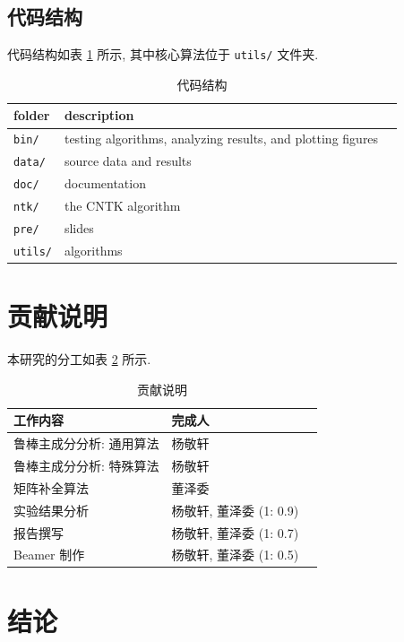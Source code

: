 \documentclass[12pt]{article}
\begin{document}
\subsection{代码结构}

代码结构如表 \ref{tab:code_framework} 所示, 其中核心算法位于 \verb|utils/| 文件夹.

\begin{table}[htbp]
  \centering
  \small
  \caption{代码结构}
  \label{tab:code_framework}
  \begin{tabular}{lll}
    \toprule
    folder & description    \\
    \midrule
    \verb|bin/|    &  testing algorithms, analyzing results, and plotting figures   \\
    \verb|data/|    &  source data and results   \\
    \verb|doc/|    &  documentation   \\
    \verb|ntk/|    &  the CNTK algorithm   \\
    \verb|pre/|    &  slides   \\
    \verb|utils/|    &  algorithms   \\
    \bottomrule
  \end{tabular}
\end{table}

\section{贡献说明}

本研究的分工如表 \ref{tab:contribution} 所示.

\begin{table}[htbp]
  \centering
  \small
  \caption{贡献说明}
  \label{tab:contribution}
  \begin{tabular}{lll}
    \toprule
    工作内容 & 完成人    \\
    \midrule
    鲁棒主成分分析: 通用算法 & 杨敬轩 \\
    鲁棒主成分分析: 特殊算法 & 杨敬轩 \\
    矩阵补全算法 & 董泽委 \\
    实验结果分析 & 杨敬轩, 董泽委 (1: 0.9) \\
    报告撰写 & 杨敬轩, 董泽委 (1: 0.7) \\
    Beamer 制作 & 杨敬轩, 董泽委 (1: 0.5) \\
    \bottomrule
  \end{tabular}
\end{table}

\section{结论}
\end{document}
